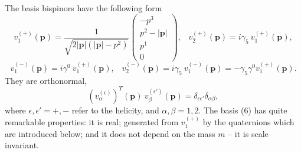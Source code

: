 \documentclass[12pt]{article}
\begin{document}
 The  basis  bispinors have the following form 
\begin{equation*}
v_1^{(+)}(\mathbf{p}) = \frac{1}{\sqrt{2  |\mathbf{p}|  (  |\mathbf{p}|  - p^2) }} \left(\begin{array}{c} - p^3\\  p^2 - |\mathbf{p}| \\ p^1 \\ 0   \end{array}  \right),    \;\;\; v_2^{(+)}(\mathbf{p}) =  i \gamma_5\: v_1^{(+)}(\mathbf{p}), 
\end{equation*}
\begin{equation}  
v_1^{(-)}(\mathbf{p}) =  i \gamma^0\: v_1^{(+)}(\mathbf{p}),  \;\;\; v_2^{(-)}(\mathbf{p}) =  i \gamma_5\: v_1^{(-)}(\mathbf{p}) = - \gamma_5 \gamma^0 v_1^{(+)}(\mathbf{p}). 
\end{equation}
They are orthonormal,
\[  (v^{(\epsilon)}_{\alpha})^T(\mathbf{p}) \: v^{(\epsilon')}_{\beta}(\mathbf{p}) = \delta_{\epsilon \epsilon'} \delta_{\alpha \beta}, \] 
where $\epsilon, \epsilon' = +, -$  refer to the helicity,  and $\alpha, \beta = 1,2.$  The basis (6)  has quite remarkable properties:   it is real;  generated  from $v_1^{(+)}$ by the quaternions  which are  introduced below; and it does not depend on the mass $m$ -- it is scale invariant. 
  
\end{document}
